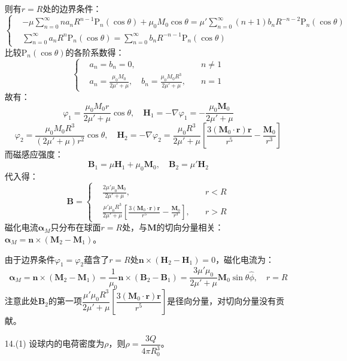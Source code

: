 \documentclass[a4paper,fontset=none]{ctexart}
\begin{document}
\begin{itemize}
    则有$r=R$处的边界条件：
    \[
    \left\{
        \begin{aligned}
        &-\mu\sum\limits_{n=0}^\infty n a_n R^{n-1}\mathrm{P}_n(\cos\theta)+\mu_0M_0\cos\theta = \mu'\sum\limits_{n=0}^\infty (n+1)b_n R^{-n-2}\mathrm{P}_n(\cos\theta) \\
        &\sum_{n=0}^\infty a_n R^n\mathrm{P}_n(\cos\theta) = \sum_{n=0}^\infty b_n R^{-n-1}\mathrm{P}_n(\cos\theta)
        \end{aligned}
    \right.
    \]
    比较$\mathrm{P}_n(\cos\theta)$的各阶系数得：
    \[
    \left\{
        \begin{aligned}
        &a_n = b_n = 0,\quad &n\neq1 \\
        &a_n = \frac{\mu_0 M_0}{2\mu'+\mu},\quad b_n = \frac{\mu_0 M_0 R^3}{2\mu'+\mu},\quad &n=1
        \end{aligned}
    \right.
    \]
    故有：
    \[
    \varphi_1 = \frac{\mu_0 M_0 r}{2\mu'+\mu}\cos\theta,\quad
    \bm{H}_1 = -\nabla\varphi_1 = -\frac{\mu_0\bm{M}_0}{2\mu'+\mu}
    \]
    \[
    \varphi_2 = \frac{\mu_0 M_0 R^3}{(2\mu'+\mu)r^2}\cos\theta,\quad
    \bm{H}_2 = -\nabla\varphi_2 = \frac{\mu_0 R^3}{2\mu'+\mu}\left[\frac{3(\bm{M}_0\cdot\bm{r})\bm{r}}{r^5}-\frac{\bm{M}_0}{r^3}\right]
    \]
    而磁感应强度：
    \[
        \bm{B}_1 = \mu\bm{H}_1 + \mu_0\bm{M}_0,\quad
        \bm{B}_2 = \mu'\bm{H}_2
    \]
    代入得：
    \[
    \bm{B} =
    \left\{
        \begin{aligned}
            &\frac{2\mu'\mu_0 \bm{M}_0}{2\mu'+\mu},\quad &r<R \\
            &\frac{\mu'\mu_0 R^3}{2\mu'+\mu}\left[\frac{3(\bm{M}_0\cdot\bm{r})\bm{r}}{r^5}-\frac{\bm{M}_0}{r^3}\right],\quad &r>R
        \end{aligned}
    \right.
    \]
    磁化电流$\bm{\alpha}_M$只分布在球面$r=R$处，与$\bm{M}$的切向分量相关：$\bm{\alpha}_M=\bm{n}\times(\bm{M}_2-\bm{M}_1)$。
    
    由于边界条件$\varphi_1=\varphi_2$蕴含了$r=R$处$\bm{n}\times(\bm{H}_2-\bm{H}_1)=0$，磁化电流为：
    \[
    \bm{\alpha}_M = \bm{n}\times(\bm{M}_2-\bm{M}_1) = \frac{1}{\mu_0}\bm{n}\times(\bm{B}_2-\bm{B}_1) = \frac{3\mu'\mu_0}{2\mu'+\mu}\bm{M}_0\sin\theta\hat{\phi},\quad r=R
    \]
    注意此处$\bm{B}_2$的第一项$\dfrac{\mu'\mu_0 R^3}{2\mu'+\mu}\left[\dfrac{3(\bm{M}_0\cdot\bm{r})\bm{r}}{r^5}\right]$是径向分量，对切向分量没有贡献。

    \item[14.(1)]
    设球内的电荷密度为$\rho$，则$\rho=\dfrac{3Q}{4\pi R_0^3}$。
    

\end{itemize}
\end{document}
